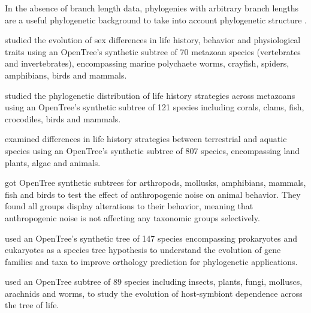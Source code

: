 \documentclass[oupdraft]{sysbio_sse}
\begin{document}
In the absence of branch length data, phylogenies with arbitrary branch lengths
are a useful phylogenetic background to take into account phylogenetic structure
\citep{garland1992procedures}.

\citep{tarka2018sex} studied the evolution of sex differences in life history, behavior
and physiological traits using an OpenTree's synthetic subtree of 70 metazoan species (vertebrates and invertebrates),
encompassing marine polychaete worms, crayfish, spiders, amphibians, birds and mammals.

\citep{healy2019animal} studied the phylogenetic distribution of life history strategies across metazoans
using an OpenTree's synthetic subtree of 121 species including corals, clams,
fish, crocodiles, birds and mammals.

\citep{capdevila2020longevity} examined differences in life history strategies between
terrestrial and aquatic species using an OpenTree's synthetic subtree of 807 species,
encompassing land plants, algae and animals.

\citep{kunc2019effects} got OpenTree synthetic subtrees for arthropods, mollusks,
amphibians, mammals, fish and birds to test the effect of anthropogenic noise on
animal behavior. They found all groups display alterations to their behavior, meaning
that anthropogenic noise is not affecting any taxonomic groups selectively.

\citep{boeckmann2015quest} used an OpenTree's synthetic tree of 147 species encompassing
prokaryotes and eukaryotes as a species tree hypothesis to understand the evolution
of gene families and taxa to improve orthology prediction for phylogenetic applications.

\citep{fisher2017evolution} used an OpenTree subtree of 89 species including insects, plants,
fungi, molluscs, arachnids and worms, to study the evolution of host-symbiont
dependence across the tree of life.
\end{document}
